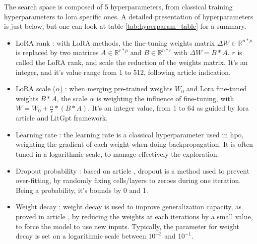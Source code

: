 The search space is composed of 5 hyperparameters, from classical training hyperparameters to \acrshort{lora} specific ones. A detailed presentation of hyperparameters is just below, but one can look at table \ref{tab:hyperparam_table} for a summary.
\begin{itemize}
    \item LoRA rank : with LoRA methods, the fine-tuning weights matrix $\Delta W \in \mathbb{R}^{n*p}$ is replaced by two matrices $A \in \mathbb{R}^{r*p}$ and $B \in \mathbb{R}^{n*r}$ with $\Delta W = B*A$. $r$ is called the LoRA rank, and scale the reduction of the weights matrix. It's an integer, and it's value range from 1 to 512, following article \cite{tribes_hyperparameter_2024} indication.
    \item LoRA scale ($\alpha$) : when merging pre-trained weights $W_0$ and Lora fine-tuned weights $B*A$, the scale $\alpha$ is weighting the influence of fine-tuning, with $W = W_0 + \frac{\alpha}{r} * (B*A)$. It's an integer value, from $1$ to $64$ as guided by \acrshort{lora} article and LitGpt framework.
    \item Learning rate : the learning rate is a classical hyperparameter used in \acrshort{hpo}, weighting the gradient of each weight when doing backpropagation. It is often tuned in a logarithmic scale, to manage effectively the exploration. 
    \item Dropout probability : based on article \cite{srivastava_dropout_2014}, dropout is a method used to prevent over-fitting, by randomly fixing cells/layers to zeroes during one iteration. Being a probability, it's bounds by 0 and 1.
    \item Weight decay : weight decay is used to improve generalization capacity, as proved in article \cite{krogh_simple_1991}, by reducing the weights at each iterations by a small value, to force the model to use new inputs. Typically, the parameter for weight decay is set on a logarithmic scale between $10^{-3}$ and $10^{-1}$.
\end{itemize}






